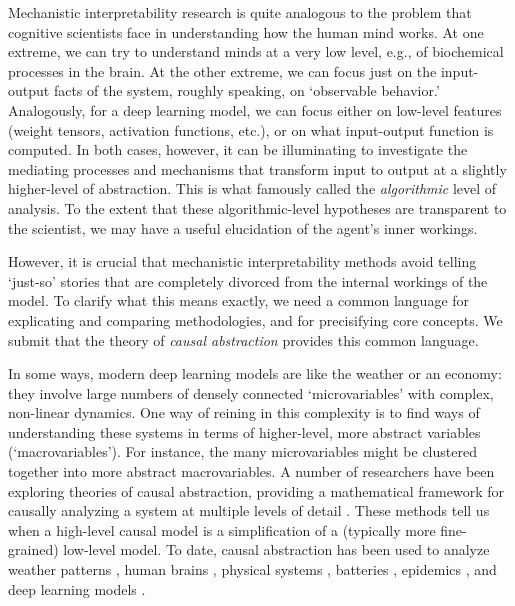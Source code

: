 \documentclass[twoside,11pt]{article}
\begin{document}
Mechanistic interpretability research is quite analogous to the problem that cognitive scientists face in understanding how the human mind works. At one extreme, we can try to understand minds at a very low level, e.g., of biochemical processes in the brain. At the other extreme, we can focus just on the input-output facts of the system, roughly speaking, on  `observable behavior.' Analogously, for a deep learning model, we can focus either on low-level features (weight tensors, activation functions, etc.), or on what input-output function is computed. In both cases, however, it can be illuminating to investigate the mediating processes and mechanisms that transform input to output at a slightly higher-level of abstraction. This is what \cite{Marr} famously called the \emph{algorithmic} level of analysis. To the extent that these algorithmic-level hypotheses are transparent to the scientist, we may have a useful elucidation of the agent's inner workings. 

However, it is crucial that mechanistic interpretability methods avoid telling `just-so' stories that are completely divorced from the internal workings of the model. To clarify what this means exactly, we need a common language for explicating and comparing methodologies, and for precisifying core concepts. We submit that the theory of \emph{causal abstraction} provides this common language. 

In some ways, modern deep learning models are like the weather or an economy: they involve large numbers of densely connected `microvariables' with complex, non-linear dynamics. One way of reining in this complexity is to find ways of understanding these systems in terms of higher-level, more abstract variables (`macrovariables'). For instance, the many microvariables might be clustered together into more abstract macrovariables. A number of researchers have been exploring  theories of causal abstraction, providing a mathematical framework for causally analyzing a system at multiple levels of detail \citep{Chalupka,Rubinstein2017,BackersHalpern2019,beckers20a,Rischel, Massidda2023, massidda2024learning}. These methods tell us when a high-level causal model is a simplification of a (typically more fine-grained) low-level model. To date, causal abstraction has been used to analyze weather patterns \citep{chalupka2016}, human brains \citep{Dubois2020PersonalityBT,Dubois2020CausalMO}, physical systems \citep{Kekic2023}, batteries \citep{Zennaro23}, epidemics \citep{Dyer2023}, and deep learning models \citep{Chalupka:2015, geiger2021causal, hu22b, Geiger-etal:2023:DAS, Wu:Geiger:2023:BDAS}.
\end{document}
